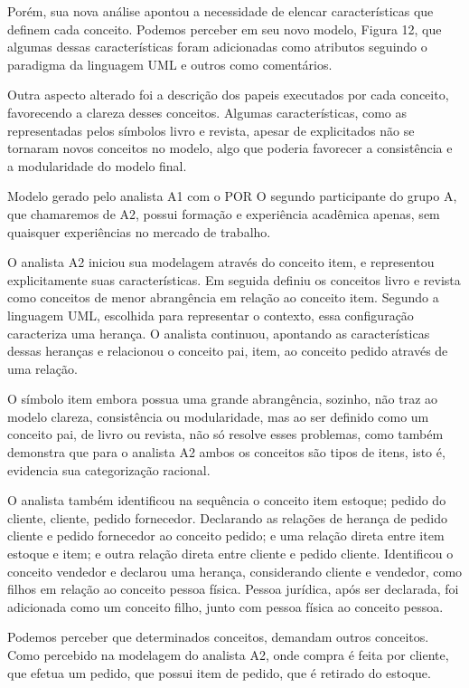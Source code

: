 Porém, sua nova análise apontou a necessidade de elencar características que definem cada conceito. Podemos perceber em seu novo modelo, Figura 12, que algumas dessas características foram adicionadas como atributos seguindo o paradigma da linguagem UML e outros como comentários. 

Outra aspecto alterado foi a descrição dos papeis executados por cada conceito, favorecendo a clareza desses conceitos. Algumas características, como as representadas pelos símbolos livro e revista, apesar de explicitados não se tornaram novos conceitos no modelo, algo que poderia favorecer a consistência e a modularidade do modelo final.


Modelo gerado pelo analista A1 com o POR
O segundo participante do grupo A, que chamaremos de A2, possui formação e experiência acadêmica apenas, sem quaisquer experiências no mercado de trabalho.

O analista A2 iniciou sua modelagem através do conceito item, e representou explicitamente suas características. Em seguida definiu os conceitos livro e revista como conceitos de menor abrangência em relação ao conceito item. Segundo a linguagem UML, escolhida para representar o contexto, essa configuração caracteriza uma herança. O analista continuou, apontando as características dessas heranças e relacionou o conceito pai, item, ao conceito pedido através de uma relação.

O símbolo item embora possua uma grande abrangência, sozinho, não traz ao modelo clareza, consistência ou modularidade, mas ao ser definido como um conceito pai, de livro ou revista, não só resolve esses problemas, como também demonstra que para o analista A2 ambos os conceitos são tipos de itens, isto é, evidencia sua categorização racional.

O analista também identificou na sequência o conceito item estoque; pedido do cliente, cliente, pedido fornecedor. Declarando as relações de herança de pedido cliente e pedido fornecedor ao conceito pedido; e uma relação direta entre item estoque e item; e outra relação direta entre cliente e pedido cliente. Identificou o conceito vendedor e declarou uma herança, considerando cliente e vendedor, como filhos em relação ao conceito pessoa física. Pessoa jurídica, após ser declarada, foi adicionada como um conceito filho, junto com pessoa física ao conceito pessoa.

Podemos perceber que determinados conceitos, demandam outros conceitos. Como percebido na modelagem do analista A2, onde compra é feita por cliente, que efetua um pedido, que possui item de pedido, que é retirado do estoque.


